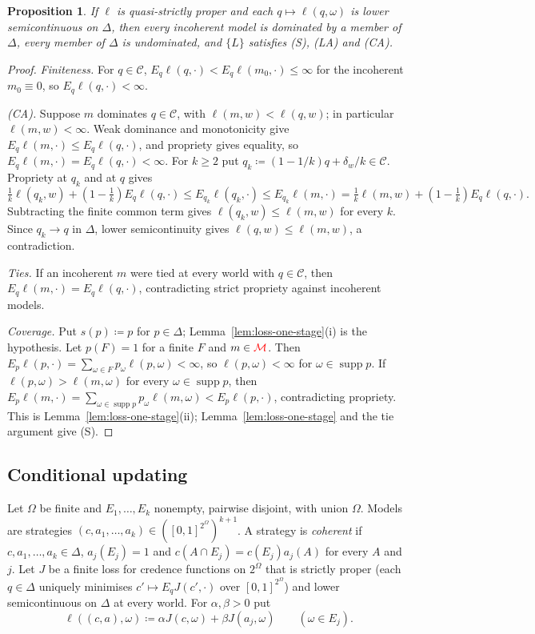 \documentclass[11pt]{article}
\newcommand{\chg}[1]{{\color{red}#1}}
\newtheorem{proposition}[theorem]{Proposition}
\theoremstyle{definition}
\theoremstyle{remark}
\newcommand{\M}{\mathcal M}
\newcommand{\C}{\mathcal C}
\newcommand{\supp}{\operatorname{supp}}
\begin{document}
\begin{proposition}\label{prop:probabilism}
If $\ell$ is quasi-strictly proper and each $q\mapsto\ell(q,\omega)$ is lower semicontinuous on $\Delta$, then every incoherent model is dominated by a member of $\Delta$, every member of $\Delta$ is undominated, and $\{L\}$ satisfies \chg{(S), (LA) and (CA)}.
\end{proposition}
\begin{proof}
\emph{Finiteness.} For $q\in\C$, $E_q\ell(q,\cdot)<E_q\ell(m_0,\cdot)\le\infty$ for the incoherent $m_0\equiv0$, so $E_q\ell(q,\cdot)<\infty$.

\emph{\chg{(CA).}} Suppose $m$ dominates $q\in\C$, with $\ell(m,w)<\ell(q,w)$; in particular $\ell(m,w)<\infty$. Weak dominance and monotonicity give $E_q\ell(m,\cdot)\le E_q\ell(q,\cdot)$, and propriety gives equality, so $E_q\ell(m,\cdot)=E_q\ell(q,\cdot)<\infty$. For $k\ge2$ put $q_k\coloneqq(1-1/k)q+\delta_w/k\in\C$. Propriety at $q_k$ and at $q$ gives
\[
\tfrac1k\ell(q_k,w)+(1-\tfrac1k)E_q\ell(q,\cdot)\le E_{q_k}\ell(q_k,\cdot)\le E_{q_k}\ell(m,\cdot)=\tfrac1k\ell(m,w)+(1-\tfrac1k)E_q\ell(q,\cdot).
\]
Subtracting the finite common term gives $\ell(q_k,w)\le\ell(m,w)$ for every $k$. Since $q_k\to q$ in $\Delta$, lower semicontinuity gives $\ell(q,w)\le\ell(m,w)$, a contradiction.

\emph{Ties.} If an incoherent $m$ were tied at every world with $q\in\C$, then $E_q\ell(m,\cdot)=E_q\ell(q,\cdot)$, contradicting strict propriety against incoherent models.

\emph{Coverage.} Put $s(p)\coloneqq p$ for $p\in\Delta$; Lemma~\ref{lem:loss-one-stage}(i) is the hypothesis. Let $p(F)=1$ for a finite $F$ and $m\in\chg{\M}$. Then $E_p\ell(p,\cdot)=\sum_{\omega\in F}p_\omega\ell(p,\omega)<\infty$, so $\ell(p,\omega)<\infty$ for $\omega\in\supp p$. If $\ell(p,\omega)>\ell(m,\omega)$ for every $\omega\in\supp p$, then $E_p\ell(m,\cdot)=\sum_{\omega\in\supp p}p_\omega\ell(m,\omega)<E_p\ell(p,\cdot)$, contradicting propriety. This is Lemma~\ref{lem:loss-one-stage}(ii); Lemma~\ref{lem:loss-one-stage} and the tie argument give \chg{(S)}.
\end{proof}

\subsection{Conditional updating}

Let $\Omega$ be finite and $E_1,\dots,E_k$ nonempty, pairwise disjoint, with union $\Omega$. Models are strategies $(c,a_1,\dots,a_k)\in([0,1]^{2^\Omega})^{k+1}$. A strategy is \emph{coherent} if $c,a_1,\dots,a_k\in\Delta$, $a_j(E_j)=1$ and $c(A\cap E_j)=c(E_j)a_j(A)$ for every $A$ and $j$. Let $J$ be a finite loss for credence functions on $2^\Omega$ that is strictly proper (each $q\in\Delta$ uniquely minimises $c'\mapsto E_qJ(c',\cdot)$ over $[0,1]^{2^\Omega}$) and lower semicontinuous on $\Delta$ at every world. For $\alpha,\beta>0$ put
\[
\ell((c,a),\omega)\coloneqq\alpha J(c,\omega)+\beta J(a_j,\omega)\qquad(\omega\in E_j).
\]
\end{document}
